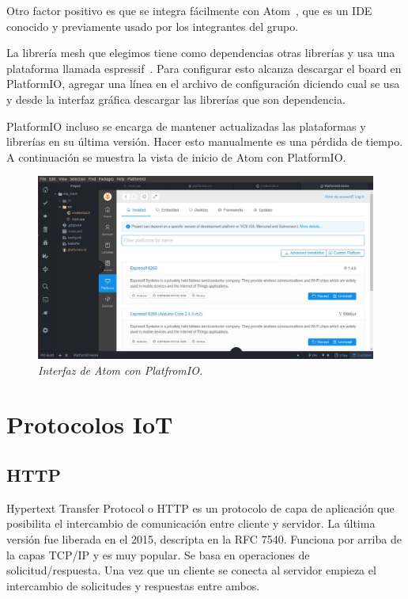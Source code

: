 Otro factor positivo es que se integra fácilmente con Atom~\cite{Atom}, que es un IDE conocido y previamente usado por los integrantes del grupo.

La librería mesh que elegimos tiene como dependencias otras librerías y usa una plataforma llamada espressif~\cite{espressif-platformio}. Para configurar esto alcanza descargar el board en PlatformIO, agregar una línea en el archivo de configuración diciendo cual se usa y desde la interfaz gráfica descargar las librerías que son dependencia. 

PlatformIO incluso se encarga de mantener actualizadas las plataformas y librerías en su última versión. Hacer esto manualmente es una pérdida de tiempo. A continuación se muestra la vista de inicio de Atom con PlatformIO.~

\begin{figure}[h!]
  \centering
  \includegraphics[width=\textwidth, keepaspectratio]{images/platformio}
  \caption{\textit{Interfaz de Atom con PlatfromIO.}}
  \label{fig:atom-plat}
\end{figure}

\section{Protocolos IoT} \label{sec:protocolos}

\subsection{HTTP}

Hypertext Transfer Protocol o HTTP es un protocolo de capa de aplicación que posibilita el intercambio de comunicación entre cliente y servidor. La última versión fue liberada en el 2015,  descripta en la RFC 7540. Funciona por arriba de la capas TCP/IP y es muy popular. Se basa en operaciones de solicitud/respuesta. Una vez que un cliente se conecta al servidor empieza el intercambio de solicitudes y respuestas entre ambos.

